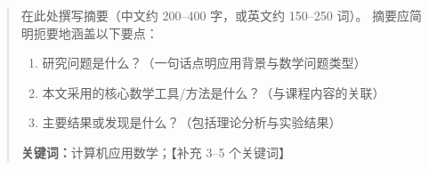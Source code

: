 \begin{abstract}
在此处撰写摘要（中文约 200--400 字，或英文约 150--250 词）。
摘要应简明扼要地涵盖以下要点：
\begin{enumerate}[nosep, leftmargin=*]
    \item 研究问题是什么？（一句话点明应用背景与数学问题类型）
    \item 本文采用的核心数学工具/方法是什么？（与课程内容的关联）
    \item 主要结果或发现是什么？（包括理论分析与实验结果）
\end{enumerate}

\noindent\textbf{关键词：}计算机应用数学；【补充 3--5 个关键词】
\end{abstract}
